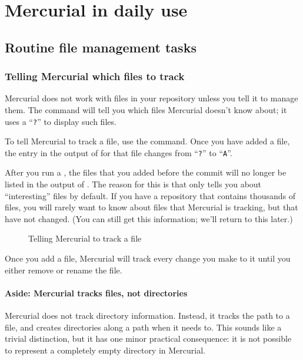 \chapter{Mercurial in daily use}
\label{chap:daily}

\section{Routine file management tasks}

\subsection{Telling Mercurial which files to track}

Mercurial does not work with files in your repository unless you tell
it to manage them.  The  command will tell you which
files Mercurial doesn't know about; it uses a ``\texttt{?}'' to
display such files.

To tell Mercurial to track a file, use the  command.  Once
you have added a file, the entry in the output of  for
that file changes from ``\texttt{?}'' to ``\texttt{A}''.

After you run a , the files that you added before the
commit will no longer be listed in the output of .  The
reason for this is that  only tells you about
``interesting'' files by default.  If you have a repository that
contains thousands of files, you will rarely want to know about files
that Mercurial is tracking, but that have not changed.  (You can still
get this information; we'll return to this later.)

\begin{figure}[ht]
  \caption{Telling Mercurial to track a file}
  \label{ex:daily:add}
\end{figure}

Once you add a file, Mercurial will track every change you make to it
until you either remove or rename the file.

\subsubsection{Aside: Mercurial tracks files, not directories}

Mercurial does not track directory information.  Instead, it tracks
the path to a file, and creates directories along a path when it needs
to.  This sounds like a trivial distinction, but it has one minor
practical consequence: it is not possible to represent a completely
empty directory in Mercurial.

